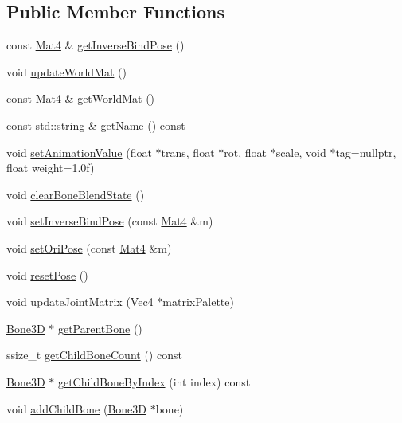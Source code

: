 \subsection*{Public Member Functions}
\begin{DoxyCompactItemize}
\item 
const \hyperlink{classMat4}{Mat4} \& \hyperlink{classBone3D_a399590986c9018faa422b53233860bbf}{get\+Inverse\+Bind\+Pose} ()
\item 
void \hyperlink{classBone3D_a9b804338ec06abeed0e6b50c8b17103a}{update\+World\+Mat} ()
\item 
const \hyperlink{classMat4}{Mat4} \& \hyperlink{classBone3D_a87f9a5957046e130b2170576717c219a}{get\+World\+Mat} ()
\item 
const std\+::string \& \hyperlink{classBone3D_a013182c8e209ddf9282c7cb6e42d3d25}{get\+Name} () const
\item 
void \hyperlink{classBone3D_a70a3d6a845913aac7ac332e4e0eb5a3c}{set\+Animation\+Value} (float $\ast$trans, float $\ast$rot, float $\ast$scale, void $\ast$tag=nullptr, float weight=1.\+0f)
\item 
void \hyperlink{classBone3D_af2cf6d23bf2e4853ff944d7d4d0ed424}{clear\+Bone\+Blend\+State} ()
\item 
void \hyperlink{classBone3D_a8fc88c76083482655350e6cba2bb4d37}{set\+Inverse\+Bind\+Pose} (const \hyperlink{classMat4}{Mat4} \&m)
\item 
void \hyperlink{classBone3D_abd2362340c7ad200d2e1e6974d27dfce}{set\+Ori\+Pose} (const \hyperlink{classMat4}{Mat4} \&m)
\item 
void \hyperlink{classBone3D_af6fe8d8595d2ffa91b490de86ce6e3e2}{reset\+Pose} ()
\item 
void \hyperlink{classBone3D_aab877746976dc466bcc339845529b2e5}{update\+Joint\+Matrix} (\hyperlink{classVec4}{Vec4} $\ast$matrix\+Palette)
\item 
\hyperlink{classBone3D}{Bone3D} $\ast$ \hyperlink{classBone3D_a9e18248b19b29586fbaca3ce62b66c32}{get\+Parent\+Bone} ()
\item 
ssize\+\_\+t \hyperlink{classBone3D_a5538e8f3e7f8af18e7183d673a2041d6}{get\+Child\+Bone\+Count} () const
\item 
\hyperlink{classBone3D}{Bone3D} $\ast$ \hyperlink{classBone3D_a0d6ff6c15e5f8ed01ffeeb60bf3b7cd0}{get\+Child\+Bone\+By\+Index} (int index) const
\item 
void \hyperlink{classBone3D_a666a91d8cb1bb98bd953144abe1385c5}{add\+Child\+Bone} (\hyperlink{classBone3D}{Bone3D} $\ast$bone)
\item 

\end{DoxyCompactItemize}
